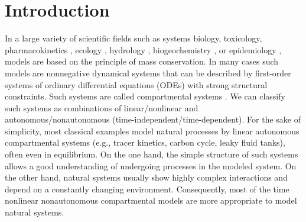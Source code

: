 \documentclass[smallextended]{svjour3}
\begin{document}
\section{Introduction}\label{intro}
In a large variety of scientific fields such as systems biology, toxicology, pharmacokinetics \citep{Anderson1983}, ecology \citep{Eriksson1971ARoEaS, Rodhe1979Tellus, Matis1979, Manzoni2009SBB}, hydrology \citep{Nash1957IASH, Botter2011GRL, Harman2014GRL}, biogeochemistry \citep{Manzoni2009SBB, Sierra2015EM}, or epidemiology \citep{Jacquez1993SIAM}, models are based on the principle of mass conservation.
In many cases such models are nonnegative dynamical systems that can be described by first-order systems of ordinary differential equations (ODEs) with strong structural constraints.
Such systems are called compartmental systems \citep{Anderson1983, Walter1999, Haddad2010}.
We can classify such systems as combinations of linear/nonlinear and autonomous/nonautonomous (time-independent/time-dependent).
For the sake of simplicity, most classical examples model natural processes by linear autonomous compartmental systems (e.g., tracer kinetics, carbon cycle, leaky fluid tanks), often even in equilibrium.
On the one hand, the simple structure of such systems allows a good understanding of undergoing processes in the modeled system. 
On the other hand, natural systems usually show highly complex interactions and depend on a constantly changing environment.
Consequently, most of the time nonlinear nonautonomous compartmental models \citep{Kloeden2013} are more appropriate to model natural systems.
\end{document}
